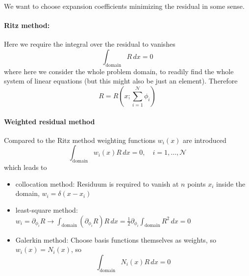 We want to choose expansion coefficients minimizing the residual in some sense.
\paragraph{Ritz method:} Here we require the integral over the residual to vanishes
\begin{equation}
    \int_{\text{domain}}{R} \, dx = 0
\end{equation}
where here we consider the whole problem domain, to readily find the whole
system of linear equations (but this might also be just an element).
Therefore
\begin{equation}
    R = R\left(x;\sum_{i=1}^{\mathcal{N}} \phi_i \right)
\end{equation}

\paragraph{Weighted residual method} Compared to the Ritz method weighting functions
$w_i(x)$ are introduced
\begin{equation}
    \int_{\text{domain}} {w_i(x) R} \, dx = 0, \quad i = 1,\dots,\mathcal{N}
\end{equation}
which leads to
\begin{itemize}
    \item \textcolor{blue1}{collocation method}: Residuum is required to vanish at $n$ points $x_i$ inside the domain, $w_i = \delta(x-x_i)$
    \item \textcolor{blue1}{least-square method}: $w_i = \partial_{\phi_i} R \rightarrow \int_{\text{domain}} (\partial_{\phi_i} R) R \, dx = \frac{1}{2} \partial_{\phi_i} \int_{\text{domain}} R^2 \, dx = 0$
    \item \textcolor{blue1}{Galerkin method}: Choose basis functions themselves as weights, so $w_i(x) = N_i(x)$, so
    \begin{equation}
        \int_{\text{domain}} N_i(x) R \, dx = 0
    \end{equation}
\end{itemize}


